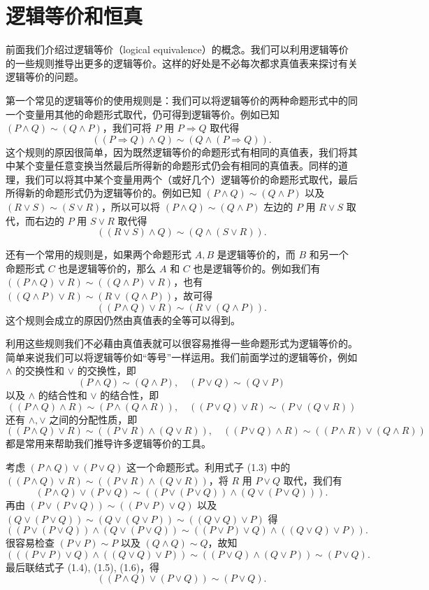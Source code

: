 \section{逻辑等价和恒真}

前面我们介绍过逻辑等价（logical equivalence）的概念。我们可以利用逻辑等价的一些规则推导出更多的逻辑等价。这样的好处是不必每次都求真值表来探讨有关逻辑等价的问题。

第一个常见的逻辑等价的使用规则是：我们可以将逻辑等价的两种命题形式中的同一个变量用其他的命题形式取代，仍可得到逻辑等价。例如已知 \((P \land Q) \sim (Q \land P)\)，我们可将 \(P\) 用 \(P \Rightarrow Q\) 取代得
\[
((P \Rightarrow Q) \land Q) \sim (Q \land (P \Rightarrow Q)).
\]
这个规则的原因很简单，因为既然逻辑等价的命题形式有相同的真值表，我们将其中某个变量任意变换当然最后所得新的命题形式仍会有相同的真值表。同样的道理，我们可以将其中某个变量用两个（或好几个）逻辑等价的命题形式取代，最后所得新的命题形式仍为逻辑等价的。例如已知 \((P \land Q) \sim (Q \land P)\) 以及 \((R \lor S) \sim (S \lor R)\)，所以可以将 \((P \land Q) \sim (Q \land P)\) 左边的 \(P\) 用 \(R \lor S\) 取代，而右边的 \(P\) 用 \(S \lor R\) 取代得
\[
((R \lor S) \land Q) \sim (Q \land (S \lor R)).
\]

还有一个常用的规则是，如果两个命题形式 \(A, B\) 是逻辑等价的，而 \(B\) 和另一个命题形式 \(C\) 也是逻辑等价的，那么 \(A\) 和 \(C\) 也是逻辑等价的。例如我们有 \(((P \land Q) \lor R) \sim ((Q \land P) \lor R)\)，也有 \(((Q \land P) \lor R) \sim (R \lor (Q \land P))\)，故可得
\[
((P \land Q) \lor R) \sim (R \lor (Q \land P)).
\]
这个规则会成立的原因仍然由真值表的全等可以得到。

利用这些规则我们不必藉由真值表就可以很容易推得一些命题形式为逻辑等价的。简单来说我们可以将逻辑等价如“等号”一样运用。我们前面学过的逻辑等价，例如 \(\land\) 的交换性和 \(\lor\) 的交换性，即
\[
(P \land Q) \sim (Q \land P), \quad (P \lor Q) \sim (Q \lor P) \tag{1.1}
\]
以及 \(\land\) 的结合性和 \(\lor\) 的结合性，即
\[
((P \land Q) \land R) \sim (P \land (Q \land R)), \quad ((P \lor Q) \lor R) \sim (P \lor (Q \lor R)) \tag{1.2}
\]
还有 \(\land , \lor\) 之间的分配性质，即
\[
((P \land Q) \lor R) \sim ((P \lor R) \land (Q \lor R)), \quad ((P \lor Q) \land R) \sim ((P \land R) \lor (Q \land R)) \tag{1.3}
\]
都是常用来帮助我们推导许多逻辑等价的工具。

\begin{example}
考虑 \((P \land Q) \lor (P \lor Q)\) 这一个命题形式。利用式子 (1.3) 中的 \(((P \land Q) \lor R) \sim ((P \lor R) \land (Q \lor R))\)，将 \(R\) 用 \(P \lor Q\) 取代，我们有
\[
(P \land Q) \lor (P \lor Q) \sim ((P \lor (P \lor Q)) \land (Q \lor (P \lor Q))). \tag{1.4}
\]
再由 \((P \lor (P \lor Q)) \sim ((P \lor P) \lor Q)\) 以及 \((Q \lor (P \lor Q)) \sim (Q \lor (Q \lor P)) \sim ((Q \lor Q) \lor P)\) 得
\[
((P \lor (P \lor Q)) \land (Q \lor (P \lor Q)) \sim ((P \lor P) \lor Q) \land ((Q \lor Q) \lor P)). \tag{1.5}
\]
很容易检查 \((P \lor P) \sim P\) 以及 \((Q \land Q) \sim Q\)，故知
\[
(((P \lor P) \lor Q) \land ((Q \lor Q) \lor P)) \sim ((P \lor Q) \land (Q \lor P)) \sim (P \lor Q). \tag{1.6}
\]
最后联结式子 (1.4), (1.5), (1.6)，得
\[
((P \land Q) \lor (P \lor Q)) \sim (P \lor Q).
\]
\end{example}

